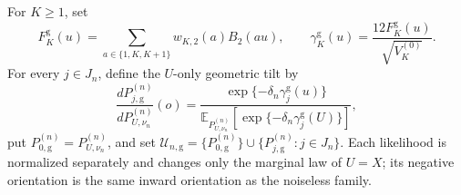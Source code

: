 For \(K\geq1\), set
\[
 F^{\mathrm g}_K(u)=\sum_{a\in\{1,K,K+1\}}w_{K,2}(a)B_2(au),\qquad
 \gamma^{\mathrm g}_K(u)=\frac{12F^{\mathrm g}_K(u)}{\sqrt{V_K^{(0)}}}.
\]
For every \(j\in J_n\), define the \(U\)-only geometric tilt by
\[
 \frac{dP_{j,\mathrm g}^{(n)}}{dP_{U,\nu_n}^{(n)}}(o)
 =\frac{\exp\{-\delta_n\gamma^{\mathrm g}_j(u)\}}
 {\mathbb E_{P_{U,\nu_n}^{(n)}}[\exp\{-\delta_n\gamma^{\mathrm g}_j(U)\}]},
\]
put \(P_{0,\mathrm g}^{(n)}=P_{U,\nu_n}^{(n)}\), and set
\(\mathcal U_{n,\mathrm g}=\{P_{0,\mathrm g}^{(n)}\}\cup\{P_{j,\mathrm g}^{(n)}:j\in J_n\}\).  Each likelihood is normalized separately and changes only the marginal law of \(U=X\); its negative orientation is the same inward orientation as the noiseless family.